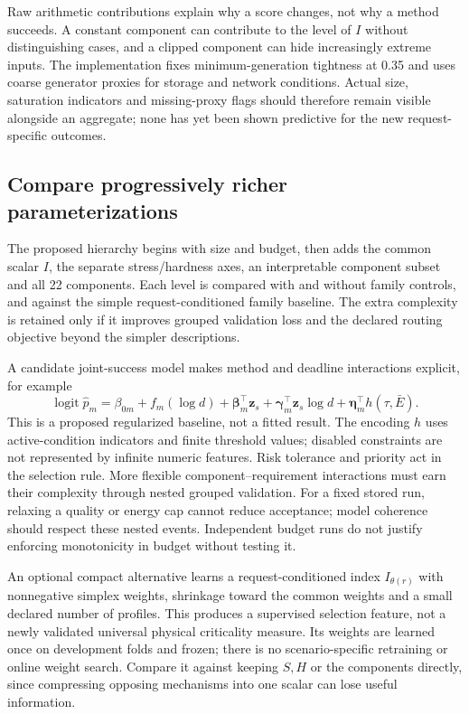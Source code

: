 Raw arithmetic contributions explain why a score changes, not why a method
succeeds. A constant component can contribute to the level of $I$ without
distinguishing cases, and a clipped component can hide increasingly extreme
inputs. The implementation fixes minimum-generation tightness at 0.35 and
uses coarse generator proxies for storage and network conditions. Actual
size, saturation indicators and missing-proxy flags should therefore remain
visible alongside an aggregate; none has yet been shown predictive for the
new request-specific outcomes.

\subsection{Compare progressively richer parameterizations}
The proposed hierarchy begins with size and budget, then adds the common
scalar $I$, the separate stress/hardness axes, an interpretable component
subset and all 22 components. Each level is compared with and without
family controls, and against the simple request-conditioned family baseline.
The extra complexity is retained only if it improves grouped validation
loss and the declared routing objective beyond the simpler descriptions.

A candidate joint-success model makes method and deadline interactions
explicit, for example
\begin{equation}
 \operatorname{logit}\widehat p_m
 =\beta_{0m}+f_m(\log d)+\boldsymbol\beta_m^\top\boldsymbol z_s
 +\boldsymbol\gamma_m^\top\boldsymbol z_s\log d
 +\boldsymbol\eta_m^\top h(\tau,\bar E).
 \label{eq:component_router}
\end{equation}
This is a proposed regularized baseline, not a fitted result. The encoding
$h$ uses active-condition indicators and finite threshold values; disabled
constraints are not represented by infinite numeric features. Risk tolerance
and priority act in the selection rule. More flexible component--requirement
interactions must earn their complexity through nested grouped validation.
For a fixed stored run, relaxing a quality or energy cap cannot reduce
acceptance; model coherence should respect these nested events. Independent
budget runs do not justify enforcing monotonicity in budget without testing it.

An optional compact alternative learns a request-conditioned index
$I_{\theta(r)}$ with nonnegative simplex weights, shrinkage toward the common
weights and a small declared number of profiles. This produces a supervised
selection feature, not a newly validated universal physical criticality
measure. Its weights are learned once on development folds and frozen;
there is no scenario-specific retraining or online weight search. Compare
it against keeping $S,H$ or the components directly, since compressing
opposing mechanisms into one scalar can lose useful information.

